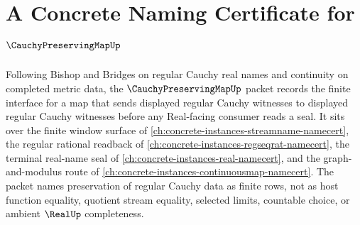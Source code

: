 \chapter{A Concrete Naming Certificate for $\CauchyPreservingMapUp$}
\label{ch:concrete-instances-cauchy-preserving-map-namecert}

Following Bishop and Bridges on regular Cauchy real names and continuity on completed metric data, the $\CauchyPreservingMapUp$ packet records the finite interface for a map that sends displayed regular Cauchy witnesses to displayed regular Cauchy witnesses before any Real-facing consumer reads a seal. It sits over the finite window surface of \autoref{ch:concrete-instances-streamname-namecert}, the regular rational readback of \autoref{ch:concrete-instances-regseqrat-namecert}, the terminal real-name seal of \autoref{ch:concrete-instances-real-namecert}, and the graph-and-modulus route of \autoref{ch:concrete-instances-continuousmap-namecert}. The packet names preservation of regular Cauchy data as finite rows, not as host function equality, quotient stream equality, selected limits, countable choice, or ambient $\RealUp$ completeness.

